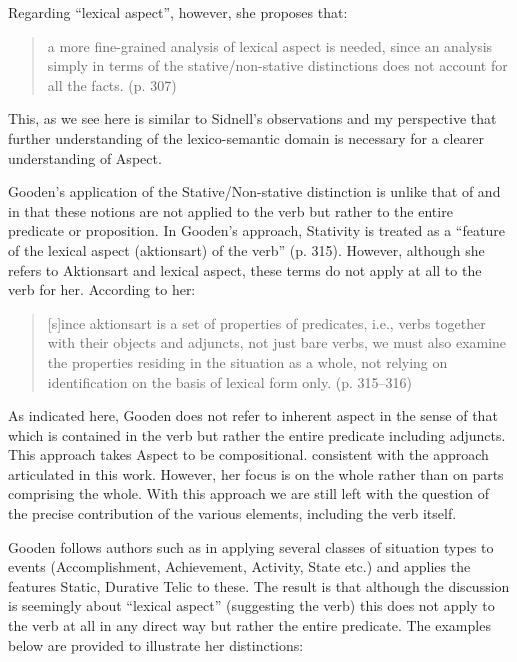 Regarding ``lexical aspect'', however, she proposes that:

\begin{quote}
  a more fine-grained analysis of lexical aspect is needed, since an
  analysis simply in terms of the stative\slash non-stative distinctions
  does not account for all the facts. (p. 307)
\end{quote}

This, as we see here is similar to Sidnell’s observations and my
perspective that further understanding of the lexico-semantic domain
is necessary for a clearer understanding of Aspect.

Gooden’s application of the Stative\slash Non-stative distinction is unlike
that of \citet{Winford1993} and \citet{Sidnell2002} in that these
notions are not applied to the verb but rather to the entire predicate
or proposition.  In Gooden’s approach, Stativity is treated as a
“feature of the lexical aspect (aktionsart) of the verb” (p. 315).
However, although she refers to Aktionsart and lexical aspect, these
terms do not apply at all to the verb for her.  According to her:

\begin{quote}
[s]ince aktionsart is a set of properties of predicates, i.e., verbs
together with their objects and adjuncts, not just bare verbs, we must
also examine the properties residing in the situation as a whole, not
relying on identification on the basis of lexical form
only. (p. 315--316)
\end{quote}

As indicated here, Gooden does not refer to inherent aspect in the
sense of that which is contained in the verb but rather the entire
predicate including adjuncts.  This approach takes Aspect to be
compositional. consistent with the approach articulated in this work.
However, her focus is on the whole rather than on parts comprising the
whole.  With this approach we are still left with the question of the
precise contribution of the various elements, including the verb
itself.

Gooden follows authors such as \citet{Dowty1979} in applying several
classes of situation types to events (Accomplishment, Achievement,
Activity, State etc.) and applies the features Static, Durative Telic
to these.  The result is that although the discussion is seemingly
about “lexical aspect” (suggesting the verb) this does not apply to
the verb at all in any direct way but rather the entire predicate.
The examples below are provided to illustrate her distinctions:

